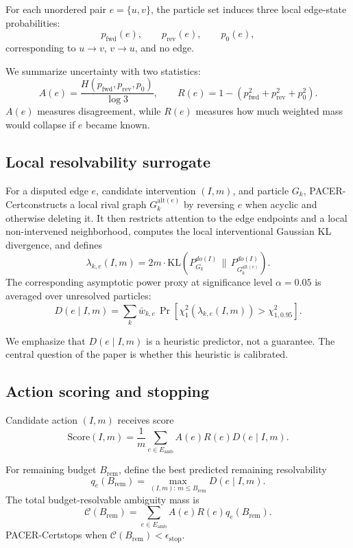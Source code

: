 \documentclass{article}
\newcommand{\method}{PACER-Cert}
\newcommand{\score}{\mathrm{Score}}
\newcommand{\certmass}{\mathcal{C}}
\newcommand{\qe}{q_e}
\newcommand{\de}{D}
\newcommand{\amb}{A}
\newcommand{\elim}{R}
\begin{document}
For each unordered pair $e=\{u,v\}$, the particle set induces three local edge-state probabilities:
\[
p_{\mathrm{fwd}}(e),\qquad p_{\mathrm{rev}}(e),\qquad p_0(e),
\]
corresponding to $u\rightarrow v$, $v\rightarrow u$, and no edge.

We summarize uncertainty with two statistics:
\[
\amb(e)=\frac{H\!\left(p_{\mathrm{fwd}},p_{\mathrm{rev}},p_0\right)}{\log 3},
\qquad
\elim(e)=1-\left(p_{\mathrm{fwd}}^2+p_{\mathrm{rev}}^2+p_0^2\right).
\]
$\amb(e)$ measures disagreement, while $\elim(e)$ measures how much weighted mass would collapse if $e$ became known.

\subsection{Local resolvability surrogate}

For a disputed edge $e$, candidate intervention $(I,m)$, and particle $G_k$, \method constructs a local rival graph $G_k^{\mathrm{alt}(e)}$ by reversing $e$ when acyclic and otherwise deleting it. It then restricts attention to the edge endpoints and a local non-intervened neighborhood, computes the local interventional Gaussian KL divergence, and defines
\[
\lambda_{k,e}(I,m)=2m\cdot \mathrm{KL}\!\left(P^{do(I)}_{G_k}\,\|\,P^{do(I)}_{G_k^{\mathrm{alt}(e)}}\right).
\]
The corresponding asymptotic power proxy at significance level $\alpha=0.05$ is averaged over unresolved particles:
\[
\de(e\mid I,m)=\sum_k \bar{w}_{k,e}\,
\Pr\!\left[\chi_1^2\!\left(\lambda_{k,e}(I,m)\right)>\chi^2_{1,0.95}\right].
\]

We emphasize that $\de(e\mid I,m)$ is a heuristic predictor, not a guarantee. The central question of the paper is whether this heuristic is calibrated.

\subsection{Action scoring and stopping}

Candidate action $(I,m)$ receives score
\[
\score(I,m)=\frac{1}{m}\sum_{e\in E_{\mathrm{amb}}}\amb(e)\elim(e)\de(e\mid I,m).
\]

For remaining budget $B_{\mathrm{rem}}$, define the best predicted remaining resolvability
\[
\qe(B_{\mathrm{rem}})=\max_{(I,m):\,m\le B_{\mathrm{rem}}} \de(e\mid I,m).
\]
The total budget-resolvable ambiguity mass is
\[
\certmass(B_{\mathrm{rem}})=\sum_{e\in E_{\mathrm{amb}}}\amb(e)\elim(e)\qe(B_{\mathrm{rem}}).
\]
\method stops when $\certmass(B_{\mathrm{rem}})<\epsilon_{\mathrm{stop}}$.
\end{document}
